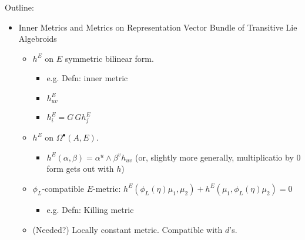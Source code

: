 {
\color{gray}
    Outline:
    
    \begin{itemize}
    
    \item Inner Metrics and Metrics on Representation Vector Bundle of Transitive Lie Algebroids
    
        \begin{itemize}
            
        \item $h^E$ on $E$ symmetric bilinear form.
        
            \begin{itemize}
                
            \item e.g. Defn: inner metric
            
            \item $h^E_{uv}$
            
            \item $h^E_i = G \, G h^E_j$
                
            \end{itemize}
        
        \item $h^E$ on $\Omega^\bullet (A, E)$.
            
            \begin{itemize}
                
            \item $h^E(\alpha, \beta) = \alpha^u \wedge \beta^v h_{uv}$ (or, slightly more generally, multiplicatio by $0$ form gets out with $h$)
                
            \end{itemize}
            
        \item $\phi_L$-compatible $E$-metric: $h^E(\phi_L(\eta) \mu_1, \mu_2) + h^E(\mu_1, \phi_L(\eta)\mu_2) = 0$
        
            \begin{itemize}
                
            \item e.g. Defn: Killing metric
                
            \end{itemize}
        
        \item (Needed?) Locally constant metric. Compatible with $d$'s.
        

\end{itemize}
\end{itemize}}
